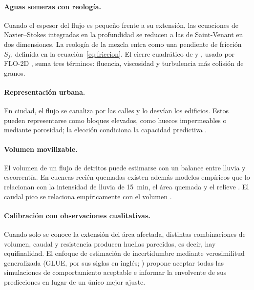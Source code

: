 \paragraph{Aguas someras con reología.} Cuando el espesor del flujo es pequeño frente a su extensión, las ecuaciones de Navier–Stokes integradas en la profundidad se reducen a las de Saint-Venant en dos dimensiones. La reología de la mezcla entra como una pendiente de fricción $S_f$, definida en la ecuación~\eqref{eq:friccion}. El cierre cuadrático de \citet{obrien1988} y \citet{obrien1993}, usado por FLO-2D \citep{flo2d2021}, suma tres términos: fluencia, viscosidad y turbulencia más colisión de granos.

\paragraph{Representación urbana.} En ciudad, el flujo se canaliza por las calles y lo desvían los edificios. Estos pueden representarse como bloques elevados, como huecos impermeables o mediante porosidad; la elección condiciona la capacidad predictiva \citep{schubert2012}.

\paragraph{Volumen movilizable.} El volumen de un flujo de detritos puede estimarse con un balance entre lluvia y escorrentía. En cuencas recién quemadas existen además modelos empíricos que lo relacionan con la intensidad de lluvia de \SI{15}{min}, el área quemada y el relieve \citep{gartner2014}. El caudal pico se relaciona empíricamente con el volumen \citep{mizuyama1992}.

\paragraph{Calibración con observaciones cualitativas.} Cuando solo se conoce la extensión del área afectada, distintas combinaciones de volumen, caudal y resistencia producen huellas parecidas, es decir, hay equifinalidad. El enfoque de estimación de incertidumbre mediante verosimilitud generalizada (GLUE, por sus siglas en inglés; \citealp{beven1992}) propone aceptar todas las simulaciones de comportamiento aceptable e informar la envolvente de sus predicciones en lugar de un único mejor ajuste.
